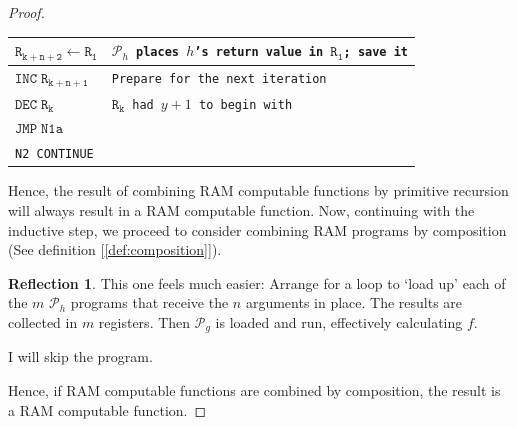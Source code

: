 \documentclass[11pt]{book}
\theoremstyle{definition}
\theoremstyle{plain}
\theoremstyle{problemstyle}
\theoremstyle{remark}
\theoremstyle{definition}
\newtheorem{reflection}{Reflection}
\begin{document}
\begin{proof}
\begin{table}[H]
\begin{center}
\begin{tabular}{|l|l|}
        \qquad$\mathtt{R_{k+n+2}\leftarrow R_1}$&\texttt{$\mathcal{P}_h$ places $h$'s return value in $\mathtt{R_1}$; save it}\\ \hline
        \qquad$\mathtt{INC\;R_{k+n+1}}$&\texttt{Prepare for the next iteration}\\ \hline 
        \qquad$\mathtt{DEC\;R_{k}}$&\texttt{$\mathtt{R_k}$ had $y+1$ to begin with}\\ \hline 
        \qquad$\mathtt{JMP\;N1a}$&\\ \hline
        \texttt{N2\; CONTINUE}&\\ \hline
    \end{tabular}
  \end{center}
\end{table}
Hence, the result of combining RAM computable functions by primitive recursion will always result in a RAM computable function. Now, continuing with the inductive step, we proceed to consider combining RAM programs by composition (See definition [\ref{def:composition}]).

\begin{reflection}
    This one feels much easier: Arrange for a loop to `load up' each of the $m$ $\mathcal{P}_h$ programs that receive the $n$ arguments in place. The results are collected in $m$ registers. Then $\mathcal{P}_g$ is loaded and run, effectively calculating $f$. 

    I will skip the program.
\end{reflection}

Hence, if RAM computable functions are combined by composition, the result is a RAM computable function.

\end{proof}

\printbibliography
\end{document}
